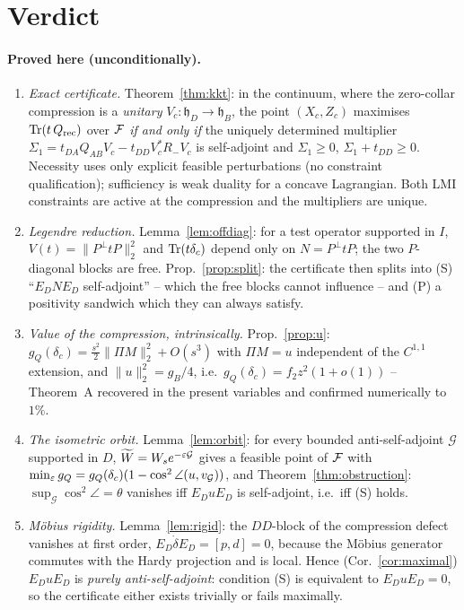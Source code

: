 \documentclass[11pt]{article}
\begin{document}
\section{Verdict}\label{sec:verdict}

\paragraph{Proved here (unconditionally).}
\begin{enumerate}[leftmargin=1.8em,itemsep=1pt]
\item[\textbf{P1}] \emph{Exact certificate.} Theorem~\ref{thm:kkt}: in the continuum,
 where the zero-collar compression is a \emph{unitary} $V_c:\mathfrak h_D\to\mathfrak h_B$,
 the point $(X_c,Z_c)$ maximises $\operatorname{Tr}(t\,Q_{\rm rec})$ over $\mathcal F$ \emph{if and only if}
 the uniquely determined multiplier
 $\Sigma_1=t_{DA}Q_{AB}V_c-t_{DD}V_c^*R_-V_c$ is self-adjoint and
 $\Sigma_1\ge0$, $\Sigma_1+t_{DD}\ge0$.  Necessity uses only explicit feasible
 perturbations (no constraint qualification); sufficiency is weak duality for a concave
 Lagrangian.  Both LMI constraints are active at the compression and the multipliers are
 unique.
\item[\textbf{P2}] \emph{Legendre reduction.} Lemma~\ref{lem:offdiag}: for a test
 operator supported in $I$, $V(t)=\|P^\perp tP\|_2^2$ and $\operatorname{Tr}(t\delta_c)$ depend only on
 $N=P^\perp tP$; the two $P$-diagonal blocks are free.  Prop.~\ref{prop:split}: the
 certificate then splits into (S) ``$E_DNE_D$ self-adjoint'' -- which the free blocks
 cannot influence -- and (P) a positivity sandwich which they can always satisfy.
\item[\textbf{P3}] \emph{Value of the compression, intrinsically.}
 Prop.~\ref{prop:u}: $g_Q(\delta_c)=\frac{s^2}2\|\Pi M\|_2^2+O(s^3)$ with
 $\Pi M=u$ independent of the $C^{1,1}$ extension, and
 $\|u\|_2^2=g_B/4$, i.e.\ $g_Q(\delta_c)=f_2z^2(1+o(1))$ -- Theorem~A recovered in the
 present variables and confirmed numerically to $1\%$.
\item[\textbf{P4}] \emph{The isometric orbit.} Lemma~\ref{lem:orbit}: for every bounded
 anti-self-adjoint $\mathcal G$ supported in $D$, $\widetilde W=W_se^{-\varepsilon\mathcal G}$
 gives a feasible point of $\mathcal F$ with
 $\min_\varepsilon g_Q=g_Q(\delta_c)(1-\cos^2\angle(u,v_{\mathcal G}))$, and
 Theorem~\ref{thm:obstruction}: $\sup_{\mathcal G}\cos^2\angle=\theta$ vanishes iff
 $E_DuE_D$ is self-adjoint, i.e.\ iff (S) holds.
\item[\textbf{P5}] \emph{M\"obius rigidity.} Lemma~\ref{lem:rigid}: the $DD$-block of the
 compression defect vanishes at first order, $E_D\dot\delta E_D=[p,d]=0$, because the
 M\"obius generator commutes with the Hardy projection and is local.  Hence
 (Cor.~\ref{cor:maximal}) $E_DuE_D$ is \emph{purely anti-self-adjoint}: condition (S) is
 equivalent to $E_DuE_D=0$, so the certificate either exists trivially or fails
 maximally.
\end{enumerate}
\end{document}
